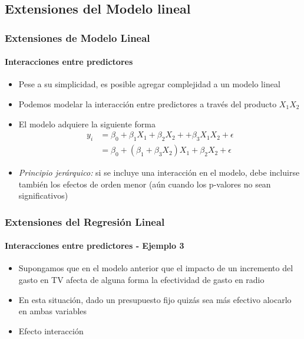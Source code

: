 \documentclass{beamer}
\begin{document}
\subsection{Extensiones del Modelo lineal}
\begin{frame}
\frametitle{Extensiones de Modelo Lineal}
\framesubtitle{Interacciones entre predictores}
	\begin{itemize}
		\item{Pese a su simplicidad, es posible agregar complejidad a un modelo lineal}
		\item{Podemos modelar la interacción entre predictores a través del producto $X_{1}X_{2}$}
		\item{El modelo adquiere la siguiente forma}
		\begin{equation}
			\begin{aligned}
				y_{i} & = \beta_{0} + \beta_{1}X_{1} + \beta_{2}X_{2} + + \beta_{3}X_{1}X_{2} + \epsilon \\
				& =  \beta_{0} + (\beta_{1} + \beta_{3} X_{2}) X_{1} + \beta_{2}X_{2} + \epsilon 
			\end{aligned}
		\end{equation}
		\item{\emph{Principio jerárquico:} si se incluye una interacción en el modelo, debe incluirse también los efectos de orden menor (aún cuando los p-valores no sean significativos)}	
	\end{itemize}
\end{frame}

\begin{frame}
\frametitle{Extensiones del Regresión Lineal}
\framesubtitle{Interacciones entre predictores - Ejemplo 3}
\begin{itemize}
	\item Supongamos que en el modelo anterior que el impacto de un incremento del gasto en TV afecta de alguna forma la efectividad de gasto en radio
	\item En esta situación, dado un presupuesto fijo quizás sea más efectivo alocarlo en ambas variables
	\item Efecto interacción
\end{itemize}
\end{frame}
\end{document}
